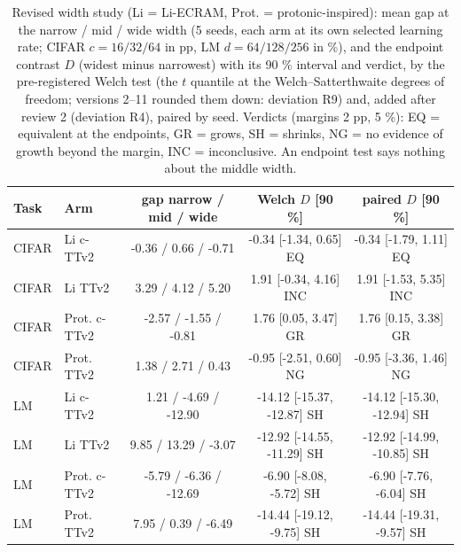 \begin{table}[t]\centering\scriptsize\caption{Revised width study (Li = Li-ECRAM, Prot. = protonic-inspired): mean gap at the narrow / mid / wide width (5 seeds, each arm at its own selected learning rate; CIFAR $c=16/32/64$ in pp, LM $d=64/128/256$ in \%), and the endpoint contrast $D$ (widest minus narrowest) with its 90 \% interval and verdict, by the pre-registered Welch test (the $t$ quantile at the Welch--Satterthwaite degrees of freedom; versions 2--11 rounded them down: deviation R9) and, added after review 2 (deviation R4), paired by seed. Verdicts (margins 2 pp, 5 \%): EQ = equivalent at the endpoints, GR = grows, SH = shrinks, NG = no evidence of growth beyond the margin, INC = inconclusive. An endpoint test says nothing about the middle width.}\label{tab:rev_width}
\begin{tabular}{llccc}\toprule Task & Arm & gap narrow / mid / wide & Welch $D$ [90 \%] & paired $D$ [90 \%]\\\midrule
CIFAR & Li c-TTv2 & -0.36 / 0.66 / -0.71 & -0.34 [-1.34, 0.65] EQ & -0.34 [-1.79, 1.11] EQ\\
CIFAR & Li TTv2 & 3.29 / 4.12 / 5.20 & 1.91 [-0.34, 4.16] INC & 1.91 [-1.53, 5.35] INC\\
CIFAR & Prot. c-TTv2 & -2.57 / -1.55 / -0.81 & 1.76 [0.05, 3.47] GR & 1.76 [0.15, 3.38] GR\\
CIFAR & Prot. TTv2 & 1.38 / 2.71 / 0.43 & -0.95 [-2.51, 0.60] NG & -0.95 [-3.36, 1.46] NG\\
LM & Li c-TTv2 & 1.21 / -4.69 / -12.90 & -14.12 [-15.37, -12.87] SH & -14.12 [-15.30, -12.94] SH\\
LM & Li TTv2 & 9.85 / 13.29 / -3.07 & -12.92 [-14.55, -11.29] SH & -12.92 [-14.99, -10.85] SH\\
LM & Prot. c-TTv2 & -5.79 / -6.36 / -12.69 & -6.90 [-8.08, -5.72] SH & -6.90 [-7.76, -6.04] SH\\
LM & Prot. TTv2 & 7.95 / 0.39 / -6.49 & -14.44 [-19.12, -9.75] SH & -14.44 [-19.31, -9.57] SH\\
\bottomrule\end{tabular}\end{table}
